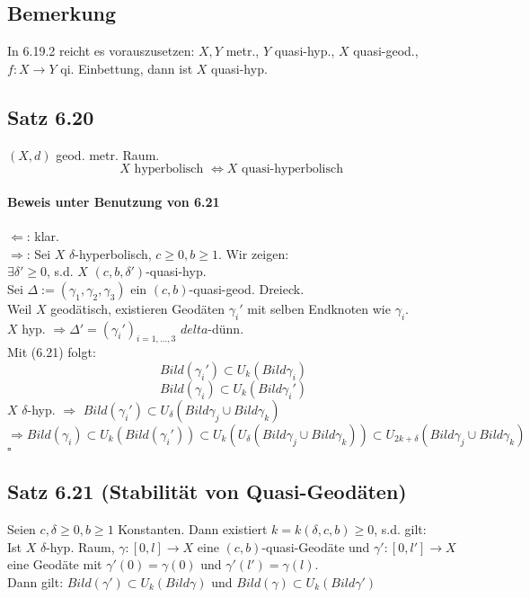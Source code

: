 \documentclass{article}
\newcommand{\qed}{$\square$}
\begin{document}
\subsection{Bemerkung}
In 6.19.2 reicht es vorauszusetzen: $X,Y$ metr., $Y$ quasi-hyp., $X$ quasi-geod., $f: X \rightarrow Y$ qi. Einbettung, dann ist $X$ quasi-hyp.

\subsection{Satz 6.20}
$(X,d)$ geod. metr. Raum.
\[X \text{ hyperbolisch } \Longleftrightarrow X \text{ quasi-hyperbolisch }  \]

\paragraph{Beweis unter Benutzung von 6.21}
$\Longleftarrow$: klar.\\
$\Longrightarrow$: Sei $X$ $\delta$-hyperbolisch, $c \geq 0,b \geq 1$. Wir zeigen:\\
$\exists \delta' \geq 0$, s.d. $X$ $(c,b,\delta')$-quasi-hyp.\\
Sei $\Delta := (\gamma_1, \gamma_2, \gamma_3)$ ein $(c,b)$-quasi-geod. Dreieck.\\
Weil $X$ geodätisch, existieren Geodäten $\gamma_i'$ mit selben Endknoten wie $\gamma_i$.\\
$X$ hyp. $\Longrightarrow \Delta' =(\gamma_i')_{i = 1,\ldots, 3}$ $delta$-dünn.\\
Mit (6.21) folgt:
\[Bild(\gamma_i') \subset U_k(Bild \gamma_i) \]
\[Bild(\gamma_i) \subset U_k(Bild \gamma_i') \]
$X$ $\delta$-hyp. $\Longrightarrow$ $Bild(\gamma_i') \subset U_\delta(Bild \gamma_j \cup Bild \gamma_k)$\\
$\Longrightarrow Bild(\gamma_i) \subset U_k(Bild(\gamma_i')) \subset  U_k(U_\delta (Bild\gamma_j \cup Bild \gamma_k)) \subset U_{2k + \delta}(Bild\gamma_j \cup Bild \gamma_k)$\qed


\subsection{Satz 6.21 (Stabilität von Quasi-Geodäten)}
Seien $c,\delta \geq 0, b \geq 1$ Konstanten. Dann existiert $k = k(\delta, c,b) \geq 0$, s.d. gilt:\\
Ist $X$ $\delta$-hyp. Raum, $\gamma : [0,l] \rightarrow X$ eine $(c,b)$-quasi-Geodäte und $\gamma' : [0,l'] \rightarrow X$ eine Geodäte mit $\gamma'(0) = \gamma(0)$ und $\gamma'(l') = \gamma(l)$.\\
Dann gilt: $Bild(\gamma') \subset U_k(Bild \gamma)$ und $Bild(\gamma) \subset U_k(Bild \gamma')$
\end{document}
